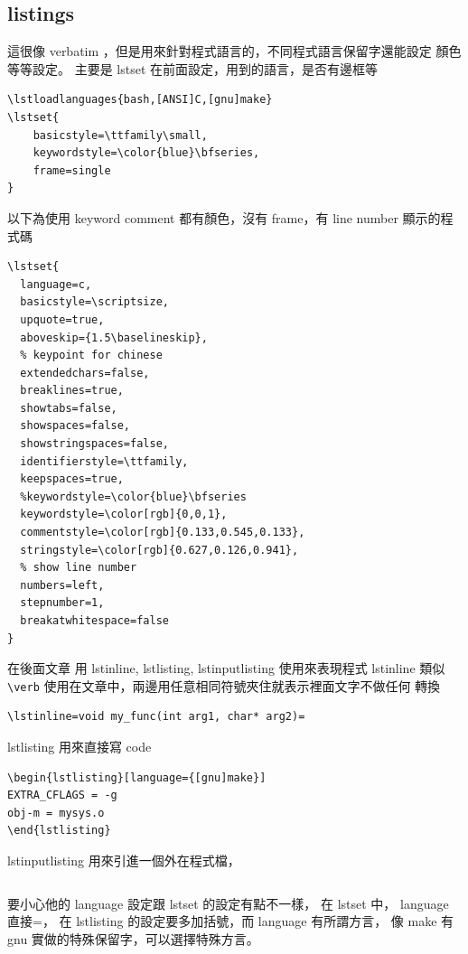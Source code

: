   \subsection{listings}
  這很像 verbatim ，但是用來針對程式語言的，不同程式語言保留字還能設定
  顏色等等設定。 主要是 lstset 在前面設定，用到的語言，是否有邊框等
  \begin{verbatim}
\lstloadlanguages{bash,[ANSI]C,[gnu]make}
\lstset{
    basicstyle=\ttfamily\small,
    keywordstyle=\color{blue}\bfseries,
    frame=single
}
  \end{verbatim}
  以下為使用 keyword comment 都有顏色，沒有 frame，有 line number 顯示的程式碼
  \begin{verbatim}
\lstset{
  language=c,
  basicstyle=\scriptsize,
  upquote=true,
  aboveskip={1.5\baselineskip},
  % keypoint for chinese
  extendedchars=false,
  breaklines=true,
  showtabs=false,
  showspaces=false,
  showstringspaces=false,
  identifierstyle=\ttfamily,
  keepspaces=true,
  %keywordstyle=\color{blue}\bfseries
  keywordstyle=\color[rgb]{0,0,1},
  commentstyle=\color[rgb]{0.133,0.545,0.133},
  stringstyle=\color[rgb]{0.627,0.126,0.941},
  % show line number
  numbers=left,
  stepnumber=1,
  breakatwhitespace=false
}
  \end{verbatim}
  在後面文章 用 lstinline, lstlisting, lstinputlisting 使用來表現程式 lstinline
  類似 \verb=\verb= 使用在文章中，兩邊用任意相同符號夾住就表示裡面文字不做任何
  轉換
  \begin{verbatim}
\lstinline=void my_func(int arg1, char* arg2)=
  \end{verbatim}
  lstlisting 用來直接寫 code
  \begin{verbatim}
\begin{lstlisting}[language={[gnu]make}]
EXTRA_CFLAGS = -g
obj-m = mysys.o
\end{lstlisting}
  \end{verbatim}
  lstinputlisting 用來引進一個外在程式檔，
  \begin{verbatim}

  \end{verbatim}
  要小心他的 language 設定跟 lstset 的設定有點不一樣， 在 lstset 中， language
  直接=， 在 lstlisting 的設定要多加括號，而 language 有所謂方言， 像 make 有
  gnu 實做的特殊保留字，可以選擇特殊方言。

